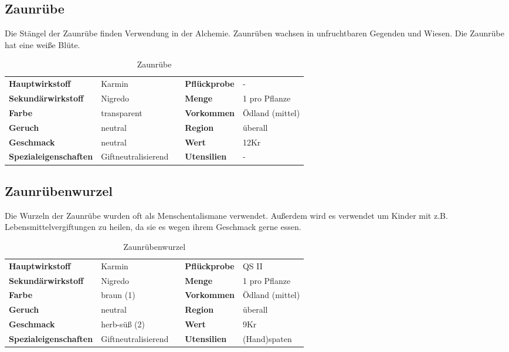 \subsection{Zaunrübe}
Die Stängel der Zaunrübe finden Verwendung in der Alchemie. Zaunrüben wachsen in unfruchtbaren Gegenden und Wiesen. Die Zaunrübe hat eine weiße Blüte.

\begin{table}[h] 
\begin{center} 
\begin{tabular}{|l|l|p{1cm}|l|l|} 
  	\cline{1-2} \cline{4-5} 
  	\textbf{Hauptwirkstoff} & Karmin && \textbf{Pflückprobe} & - \\ \cline{1-2} \cline{4-5} 
  	\textbf{Sekundärwirkstoff} & Nigredo && \textbf{Menge} & 1 pro Pflanze \\ \cline{1-2} \cline{4-5} 
  	\textbf{Farbe} & transparent && \textbf{Vorkommen} & Ödland (mittel) \\ \cline{1-2} \cline{4-5} 
  	\textbf{Geruch} & neutral && \textbf{Region} & überall \\ \cline{1-2} \cline{4-5} 
  	\textbf{Geschmack} & neutral && \textbf{Wert} & 12Kr \\ \cline{1-2} \cline{4-5} 
  	\textbf{Spezialeigenschaften} & Giftneutralisierend && \textbf{Utensilien} & - \\ \cline{1-2} \cline{4-5} 
\end{tabular} 
\end{center} 
\caption{Zaunrübe} 
\label{tab:zaunruebe} 
\end{table}


\subsection{Zaunrübenwurzel}
Die Wurzeln der Zaunrübe wurden oft als Menschentalismane verwendet. Außerdem wird es verwendet um Kinder mit z.B. Lebensmittelvergiftungen zu heilen, da sie es wegen ihrem Geschmack gerne essen.

\begin{table}[h] 
\begin{center} 
\begin{tabular}{|l|l|p{1cm}|l|l|} 
  	\cline{1-2} \cline{4-5} 
  	\textbf{Hauptwirkstoff} & Karmin && \textbf{Pflückprobe} & QS II \\ \cline{1-2} \cline{4-5} 
  	\textbf{Sekundärwirkstoff} & Nigredo && \textbf{Menge} & 1 pro Pflanze \\ \cline{1-2} \cline{4-5} 
  	\textbf{Farbe} & braun (1) && \textbf{Vorkommen} & Ödland (mittel) \\ \cline{1-2} \cline{4-5} 
  	\textbf{Geruch} & neutral && \textbf{Region} & überall \\ \cline{1-2} \cline{4-5} 
  	\textbf{Geschmack} & herb-süß (2) && \textbf{Wert} & 9Kr \\ \cline{1-2} \cline{4-5} 
  	\textbf{Spezialeigenschaften} & Giftneutralisierend && \textbf{Utensilien} & (Hand)spaten \\ \cline{1-2} \cline{4-5} 
\end{tabular} 
\end{center} 
\caption{Zaunrübenwurzel} 
\label{tab:zaunruebenwurzel} 
\end{table}


